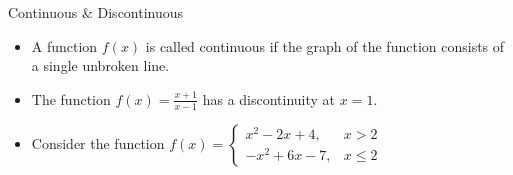 \documentclass[10pt]{beamer}
\begin{document}
\begin{frame}{Continuous \& Discontinuous}
  \begin{itemize}[<+->]
  	\item A function $f(x)$ is called continuous if the graph of the function consists of a single unbroken line.
  	\item <2> The function $f(x) = \frac{x+1}{x-1}$ has a discontinuity at $x=1$.
  	\item <3> Consider the function $f(x) = \begin{cases} x^2 - 2x + 4, & x > 2 \\ -x^2 + 6x - 7, & x \leq 2 \end{cases}$ 
  \end{itemize}


\end{frame}
\end{document}
